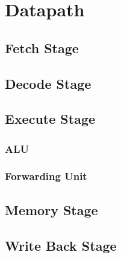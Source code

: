 %
\chapter{Datapath}
\label{cha2}
\section{Fetch Stage}
\section{Decode Stage}
\section{Execute Stage}
\subsection{ALU}
\subsection{Forwarding Unit}

\section{Memory Stage}
\section{Write Back Stage}
